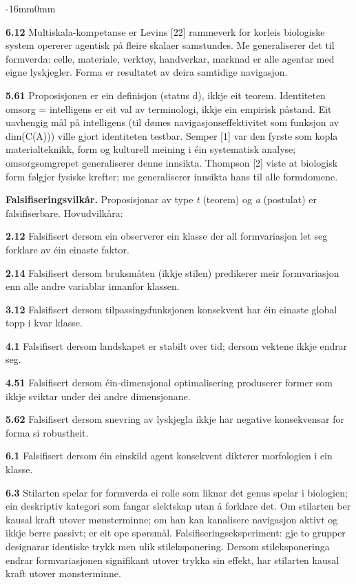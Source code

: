 \documentclass[10pt,oneside]{book}
\newenvironment{widebody}{%
  \begin{adjustwidth}{-16mm}{0mm}%
}{%
  \end{adjustwidth}%
}
\begin{document}
\begin{widebody}
{\textbf{6.12} Multiskala-kompetanse er Levins [22] rammeverk for korleis biologiske system opererer agentisk på fleire skalaer samstundes. Me generaliserer det til formverda: celle, materiale, verktøy, handverkar, marknad er alle agentar med eigne lyskjegler. Forma er resultatet av deira samtidige navigasjon.

\textbf{5.61} Proposisjonen er ein definisjon (status d), ikkje eit teorem. Identiteten omsorg = intelligens er eit val av terminologi, ikkje ein empirisk påstand. Eit uavhengig mål på intelligens (til dømes navigasjonseffektivitet som funksjon av dim(C(A))) ville gjort identiteten testbar. Semper [1] var den fyrste som kopla materialteknikk, form og kulturell meining i éin systematisk analyse; omsorgsomgrepet generaliserer denne innsikta. Thompson [2] viste at biologisk form følgjer fysiske krefter; me generaliserer innsikta hans til alle formdomene.

\bigskip
\textbf{Falsifiseringsvilkår.} Proposisjonar av type \textit{t} (teorem) og \textit{a} (postulat) er falsifiserbare. Hovudvilkåra:

\textbf{2.12} Falsifisert dersom ein observerer ein klasse der all formvariasjon let seg forklare av éin einaste faktor.

\textbf{2.14} Falsifisert dersom bruksmåten (ikkje stilen) predikerer meir formvariasjon enn alle andre variablar innanfor klassen.

\textbf{3.12} Falsifisert dersom tilpassingsfunksjonen konsekvent har éin einaste global topp i kvar klasse.

\textbf{4.1} Falsifisert dersom landskapet er stabilt over tid; dersom vektene ikkje endrar seg.

\textbf{4.51} Falsifisert dersom éin-dimensjonal optimalisering produserer former som ikkje sviktar under dei andre dimensjonane.

\textbf{5.62} Falsifisert dersom snevring av lyskjegla ikkje har negative konsekvensar for forma si robustheit.

\textbf{6.1} Falsifisert dersom éin einskild agent konsekvent dikterer morfologien i ein klasse.

\textbf{6.3} Stilarten spelar for formverda ei rolle som liknar det genus spelar i biologien; ein deskriptiv kategori som fangar slektskap utan å forklare det. Om stilarten ber kausal kraft utover mønsterminne; om han kan kanalisere navigasjon aktivt og ikkje berre passivt; er eit ope spørsmål. Falsifiseringseksperiment: gje to grupper designarar identiske trykk men ulik stileksponering. Dersom stileksponeringa endrar formvariasjonen signifikant utover trykka sin effekt, har stilarten kausal kraft utover mønsterminne.

}
\end{widebody}
\end{document}
